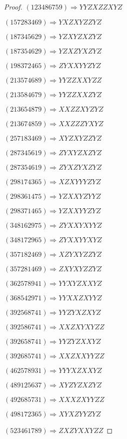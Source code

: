 \documentclass[12pt]{article}
\theoremstyle{plain}
\theoremstyle{definition}
\theoremstyle{remark}
\begin{document}
\begin{proof}
	
	
	$(1 2 3 4 8 6 7 5 9)\Rightarrow YYZXZZXYZ$
	
	$(1 5 7 2 8 3 4 6 9)\Rightarrow YXZXYZZYZ$
	
	$(1 8 7 3 4 5 6 2 9)\Rightarrow YZXYZXZYZ$
	
	$(1 8 7 3 5 4 6 2 9)\Rightarrow YZXZYXZYZ$
	
	$(1 9 8 3 7 2 4 6 5)\Rightarrow ZYXXYYZYZ$
	
	$(2 1 3 5 7 4 6 8 9)\Rightarrow YYZZXXYZZ$
	
	$(2 1 3 5 8 4 6 7 9)\Rightarrow YYZZXXZYZ$
	
	$(2 1 3 6 5 4 8 7 9)\Rightarrow XXZZXYZYZ$
	
	$(2 1 3 6 7 4 8 5 9)\Rightarrow XXZZZYXYZ$
	
	$(2 5 7 1 8 3 4 6 9)\Rightarrow XYZXYZZYZ$
	
	$(2 8 7 3 4 5 6 1 9)\Rightarrow ZYXYZXZYZ$
	
	$(2 8 7 3 5 4 6 1 9)\Rightarrow ZYXZYXZYZ$
	
	$(2 9 8 1 7 4 3 6 5)\Rightarrow XZXYYYZYZ$
	
	$(2 9 8 3 6 1 4 7 5)\Rightarrow YZXXYZYYZ$
	
	$(2 9 8 3 7 1 4 6 5)\Rightarrow YZXXYYZYZ$
	
	$(3 4 8 1 6 2 9 7 5)\Rightarrow ZYXXYXYYZ$
	
	$(3 4 8 1 7 2 9 6 5)\Rightarrow ZYXXYYXYZ$
	
	$(3 5 7 1 8 2 4 6 9)\Rightarrow XZYXYZZYZ$
	
	$(3 5 7 2 8 1 4 6 9)\Rightarrow ZXYXYZZYZ$
	
	$(3 6 2 5 7 8 9 4 1)\Rightarrow YYXYZXXYZ$
	
	$(3 6 8 5 4 2 9 7 1)\Rightarrow YYXXZXYYZ$
	
	$(3 9 2 5 6 8 7 4 1)\Rightarrow YYZYXZXYZ$
	
	$(3 9 2 5 8 6 7 4 1)\Rightarrow XXZXYXYZZ$
	
	$(3 9 2 6 5 8 7 4 1)\Rightarrow YYZYZXXYZ$
	
	$(3 9 2 6 8 5 7 4 1)\Rightarrow XXZXXYYZZ$
	
	$(4 6 2 5 7 8 9 3 1)\Rightarrow YYYXZXXYZ$
	
	$(4 8 9 1 2 5 6 3 7)\Rightarrow XYZYZXZYZ$
	
	$(4 9 2 6 8 5 7 3 1)\Rightarrow XXXZXYYZZ$
	
	$(4 9 8 1 7 2 3 6 5)\Rightarrow XYXZYYZYZ$
	
	$(5 2 3 4 6 1 7 8 9)\Rightarrow ZXZYXXYZZ$
	

\end{proof}
\end{document}
